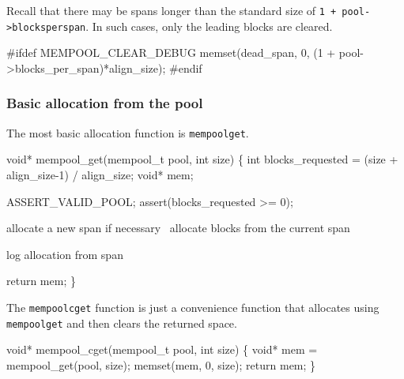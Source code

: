 Recall that there may be spans longer than the standard size of
{\tt{}1\ +\ pool->blocks{}per{}span}.  In such cases, only the leading
blocks are cleared.

\nwenddocs{}\endmoddef
#ifdef MEMPOOL_CLEAR_DEBUG
memset(dead_span, 0, (1 + pool->blocks_per_span)*align_size);
#endif
\nwendcode{}\nwdocspar


\subsubsection{Basic allocation from the pool}

The most basic allocation function is {\tt{}mempool{}get}.

\nwenddocs{}\plusendmoddef
void* mempool_get(mempool_t pool, int size)
\{
    int blocks_requested = (size + align_size-1) / align_size;
    void* mem;

    ASSERT_VALID_POOL;
    assert(blocks_requested >= 0);

    \LA{}allocate a new span if necessary~{\nwtagstyle{}}\RA{}
    \LA{}allocate blocks from the current span~{\nwtagstyle{}}\RA{}

    \LA{}log allocation from span~{\nwtagstyle{}}\RA{}

    return mem;
\}

\nwendcode{}\nwdocspar

The {\tt{}mempool{}cget} function is just a convenience function
that allocates using {\tt{}mempool{}get} and then clears the
returned space.

\nwenddocs{}\plusendmoddef
void* mempool_cget(mempool_t pool, int size)
\{
    void* mem = mempool_get(pool, size);
    memset(mem, 0, size);
    return mem;
\}

\nwendcode{}\nwdocspar

